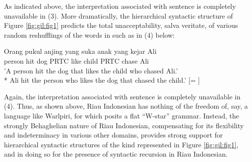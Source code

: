 \documentclass[output=paper,colorlinks,citecolor=brown
]{langscibook}
\begin{document}
As indicated above, the interpretation associated with sentence  is completely unavailable in (3).  More dramatically, the hierarchical syntactic structure of Figure \ref{fig:gil:fig1} predicts the total unacceptability, salva veritate, of various random reshufflings of the words in  such as in (4) below:

\ea
\gll Orang	pukul	anjing	yang	suka	anak	yang	kejar	Ali \\
    person	hit	dog	PRTC	like	child	PRTC	chase	Ali\\
\glt 		'A person hit the dog that likes the child who chased Ali.' \\
*	Ali hit the person who likes the dog that chased the child.' [= ]
\z

Again, the interpretation associated with sentence  is completely unavailable in (4).  Thus, as shown above, Riau Indonesian has nothing of the freedom of, say, a language like Warlpiri, for which \citet{hale1979position, hale1983warlpiri} posits a flat ``W-star'' grammar. Instead, the strongly Behaghelian nature of Riau Indonesian, compensating for its flexibility and indeterminacy in various other domains, provides strong support for hierarchical syntactic structures of the kind represented in Figure \ref{fig:gil:fig1}, and in doing so for the presence of syntactic recursion in Riau Indonesian.
\end{document}
